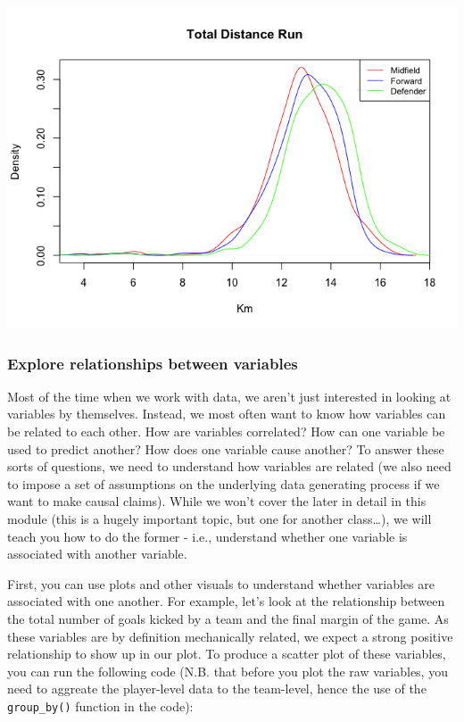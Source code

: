 \documentclass[
]{article}
\begin{document}
\includegraphics{Preparation_files/figure-gfm/unnamed-chunk-16-1.png}

\hypertarget{explore-relationships-between-variables}{%
\subsubsection{Explore relationships between
variables}\label{explore-relationships-between-variables}}

Most of the time when we work with data, we aren't just interested in
looking at variables by themselves. Instead, we most often want to know
how variables can be related to each other. How are variables
correlated? How can one variable be used to predict another? How does
one variable cause another? To answer these sorts of questions, we need
to understand how variables are related (we also need to impose a set of
assumptions on the underlying data generating process if we want to make
causal claims). While we won't cover the later in detail in this module
(this is a hugely important topic, but one for another class\ldots), we
will teach you how to do the former - i.e., understand whether one
variable is associated with another variable.

First, you can use plots and other visuals to understand whether
variables are associated with one another. For example, let's look at
the relationship between the total number of goals kicked by a team and
the final margin of the game. As these variables are by definition
mechanically related, we expect a strong positive relationship to show
up in our plot. To produce a scatter plot of these variables, you can
run the following code (N.B. that before you plot the raw variables, you
need to aggreate the player-level data to the team-level, hence the use
of the \texttt{group\_by()} function in the code):
\end{document}
